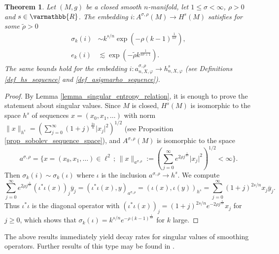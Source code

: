 \documentclass[12pt,twoside]{amsart}
\numberwithin{equation}{section}
\renewcommand{\leq}{\leqslant}
\renewcommand{\geq}{\geqslant}
\renewcommand{\mathbb}{\varmathbb}
\newtheorem{theorem}{Theorem}[section]
\newcommand{\mR}{\mathbb{R}}                    %
\newcommand{\abs}[1]{\lvert #1 \rvert}          %
\newcommand{\norm}[1]{\lVert #1 \rVert}         %
\newcommand{\ol}[1]{\overline{#1}}
\begin{document}
\begin{theorem} \label{thm_analytic_inclusion}
Let $(M,g)$ be a closed smooth $n$-manifold, let $1 \leq \sigma < \infty$, $\rho > 0$ and $s \in \mR$. The embedding $i: A^{\sigma,\rho}(M) \to H^s(M)$ satisfies for some $\tilde{\rho} > 0$ 
\begin{align*}
\sigma_k(i) &\sim k^{s/n} \exp(-\rho (k-1)^{\frac{1}{n \sigma}}), \\
e_k(i) &\lesssim \exp(-\tilde{\rho} k^{\frac{1}{n \sigma + 1}}).
\end{align*}
The same bounds hold for the embedding $i: a^{\sigma,\rho}_{n,X,\varphi} \to h^s_{n,X,\varphi}$ (see Definitions \ref{def_hs_sequence} and \ref{def_asigmarho_sequence}).
\end{theorem}
\begin{proof}
By Lemma \ref{lemma_singular_entropy_relation}, it is enough to prove the statement about singular values. Since $M$ is closed, $H^s(M)$ is isomorphic to the space $h^s$ of sequences $x = (x_0, x_1, \ldots)$ with norm $\norm{x}_{h^s} = ( \sum_{j=0}^{\infty} (1+j)^{\frac{2s}{n}} \abs{x_j}^2 )^{1/2}$ (see Proposition \ref{prop_sobolev_sequence_space}), and $A^{\sigma,\rho}(M)$ is isomorphic to the space 
\[
a^{\sigma,\rho} = \{ x = (x_0, x_1, \ldots) \in \ell^2 \,;\, \norm{x}_{a^{\sigma,\rho}} := (\sum_{j=0}^{\infty} e^{2\rho j^{\frac{1}{n \sigma}}} \abs{x_j}^2)^{1/2} < \infty \}.
\]
Then $\sigma_k(i) \sim \sigma_k(\iota)$ where $\iota$ is the inclusion $a^{\sigma,\rho} \to h^s$. We compute 
\[
\sum_{j=0}^{\infty} e^{2\rho j^{\frac{1}{n \sigma}}} (\iota^* \iota(x))_j \ol{y}_j = (\iota^* \iota(x), y)_{a^{\sigma,\rho}} = (\iota(x), \iota(y))_{h^s} = \sum_{j=0}^{\infty} (1+j)^{2s/n} x_j \ol{y}_j.
\]
Thus $\iota^* \iota$ is the diagonal operator with $(\iota^* \iota(x))_j = (1+j)^{2s/n} e^{-2\rho j^{\frac{1}{n \sigma}}} x_j$ for $j \geq 0$, which shows that $\sigma_k(\iota) = k^{s/n}e^{-\rho (k-1)^{\frac{1}{n \sigma}}}$ for $k$ large.
\end{proof}

The above results immediately yield decay rates for singular values of smoothing operators. Further results of this type may be found in \cite{BS77}.
\end{document}
